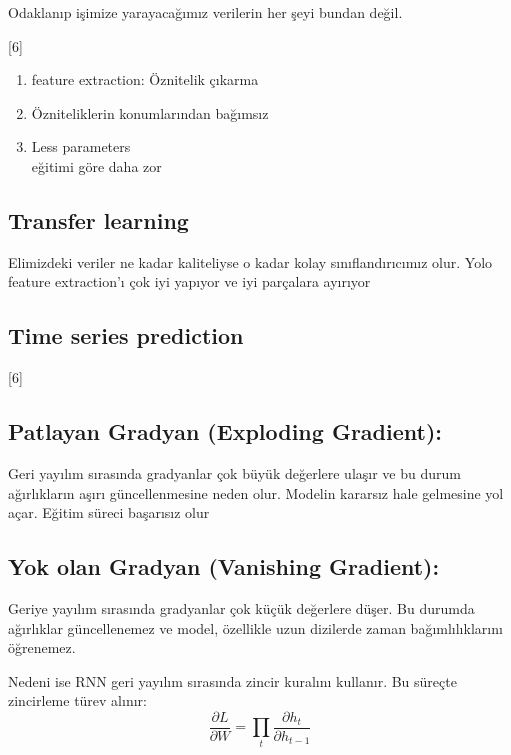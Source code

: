\documentclass[11pt,a4paper]{article}
\begin{document}
Odaklanıp işimize yarayacağımız verilerin her şeyi bundan değil.

[6]

\begin{enumerate}[label=(\arabic*)]
  \item feature extraction: Öznitelik çıkarma
  \item Özniteliklerin konumlarından bağımsız
  \item Less parameters \\ eğitimi \okunamadi{} göre daha zor
\end{enumerate}

\subsection{Transfer learning}

Elimizdeki veriler ne kadar kaliteliyse o kadar kolay sınıflandırıcımız olur. Yolo feature extraction'ı çok iyi yapıyor ve iyi parçalara ayırıyor

\subsection{Time series prediction}

[6]

\subsection{Patlayan Gradyan (Exploding Gradient):}

Geri yayılım sırasında gradyanlar çok büyük değerlere ulaşır ve bu durum ağırlıkların aşırı güncellenmesine neden olur. Modelin kararsız hale gelmesine yol açar. Eğitim süreci başarısız olur

\subsection{Yok olan Gradyan (Vanishing Gradient):}

Geriye yayılım sırasında gradyanlar çok küçük değerlere düşer. Bu durumda ağırlıklar güncellenemez ve model, özellikle uzun dizilerde zaman bağımlılıklarını öğrenemez.

Nedeni ise RNN geri yayılım sırasında zincir kuralını kullanır. Bu süreçte zincirleme türev alınır:
\[ \frac{\partial L}{\partial W}=\prod_t \frac{\partial h_t}{\partial h_{t-1}} \]
\end{document}
